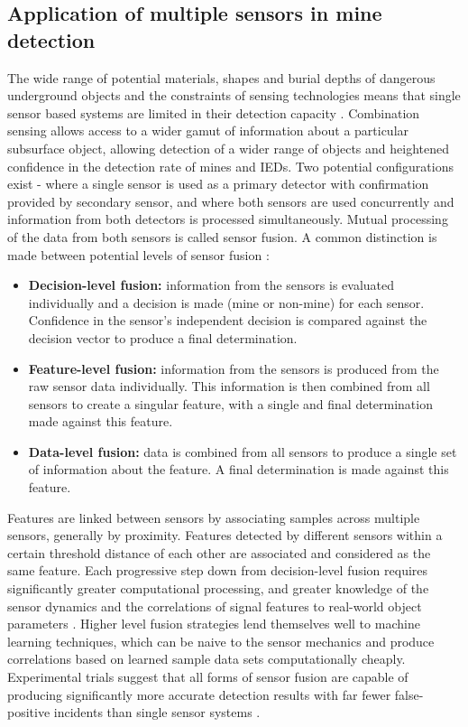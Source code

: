 \documentclass[main.tex]{subfiles}
\begin{document}
\subsection{Application of multiple sensors in mine detection}
The wide range of potential materials, shapes and burial depths of dangerous underground objects and the constraints of sensing technologies means that single sensor based systems are limited in their detection capacity \parencite{Yarovoy2009}. Combination sensing allows access to a wider gamut of information about a particular subsurface object, allowing detection of a wider range of objects and heightened confidence in the detection rate of mines and IEDs. Two potential configurations exist - where a single sensor is used as a primary detector with confirmation provided by secondary sensor, and where both sensors are used concurrently and information from both detectors is processed simultaneously. Mutual processing of the data from both sensors is called sensor fusion. A common distinction is made between potential levels of sensor fusion \parencite{Yarovoy2009}:
\begin{itemize}
\item \textbf{Decision-level fusion:} information from the sensors is evaluated individually and a decision is made (mine or non-mine) for each sensor. Confidence in the sensor's independent decision is compared against the decision vector to produce a final determination.
\item \textbf{Feature-level fusion:} information from the sensors is produced from the raw sensor data individually. This information is then combined from all sensors to create a singular feature, with a single and final determination made against this feature. 
\item \textbf{Data-level fusion:} data is combined from all sensors to produce a single set of information about the feature. A final determination is made against this feature.
\end{itemize}
Features are linked between sensors by associating samples across multiple sensors, generally by proximity. Features detected by different sensors within a certain threshold distance of each other are associated and considered as the same feature. Each progressive step down from decision-level fusion requires significantly greater computational processing, and greater knowledge of the sensor dynamics and the correlations of signal features to real-world object parameters \parencite{Yarovoy2009}. Higher level fusion strategies lend themselves well to machine learning techniques, which can be naive to the sensor mechanics and produce correlations based on learned sample data sets computationally cheaply. Experimental trials suggest that all forms of sensor fusion are capable of producing significantly more accurate detection results with far fewer false-positive incidents than single sensor systems \parencite{Yarovoy2009}.
\end{document}
